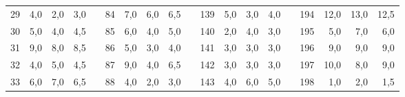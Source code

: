 \begin{table}[H]
{\begin{tabular}{|c|r|r|r|l|c|r|r|r|l|c|r|r|r|lcrrr}
29                                                    & 4,0                                                                       & 2,0                                                                       & 3,0                                                                       &  & 84  & 7,0  & 6,0  & 6,5  &  & 139 & 5,0  & 3,0  & 4,0  & \multicolumn{1}{l|}{} & \multicolumn{1}{c|}{194} & \multicolumn{1}{r|}{12,0} & \multicolumn{1}{r|}{13,0} & \multicolumn{1}{r|}{12,5} \\ \cline{1-4} \cline{6-9} \cline{11-14} \cline{16-19} 
30                                                    & 5,0                                                                       & 4,0                                                                       & 4,5                                                                       &  & 85  & 6,0  & 4,0  & 5,0  &  & 140 & 2,0  & 4,0  & 3,0  & \multicolumn{1}{l|}{} & \multicolumn{1}{c|}{195} & \multicolumn{1}{r|}{5,0}  & \multicolumn{1}{r|}{7,0}  & \multicolumn{1}{r|}{6,0}  \\ \cline{1-4} \cline{6-9} \cline{11-14} \cline{16-19} 
31                                                    & 9,0                                                                       & 8,0                                                                       & 8,5                                                                       &  & 86  & 5,0  & 3,0  & 4,0  &  & 141 & 3,0  & 3,0  & 3,0  & \multicolumn{1}{l|}{} & \multicolumn{1}{c|}{196} & \multicolumn{1}{r|}{9,0}  & \multicolumn{1}{r|}{9,0}  & \multicolumn{1}{r|}{9,0}  \\ \cline{1-4} \cline{6-9} \cline{11-14} \cline{16-19} 
32                                                    & 4,0                                                                       & 5,0                                                                       & 4,5                                                                       &  & 87  & 9,0  & 4,0  & 6,5  &  & 142 & 3,0  & 3,0  & 3,0  & \multicolumn{1}{l|}{} & \multicolumn{1}{c|}{197} & \multicolumn{1}{r|}{10,0} & \multicolumn{1}{r|}{8,0}  & \multicolumn{1}{r|}{9,0}  \\ \cline{1-4} \cline{6-9} \cline{11-14} \cline{16-19} 
33                                                    & 6,0                                                                       & 7,0                                                                       & 6,5                                                                       &  & 88  & 4,0  & 2,0  & 3,0  &  & 143 & 4,0  & 6,0  & 5,0  & \multicolumn{1}{l|}{} & \multicolumn{1}{c|}{198} & \multicolumn{1}{r|}{1,0}  & \multicolumn{1}{r|}{2,0}  & \multicolumn{1}{r|}{1,5}  \\ \cline{1-4} \cline{6-9} \cline{11-14} \cline{16-19} 

\end{tabular}}
\end{table}
